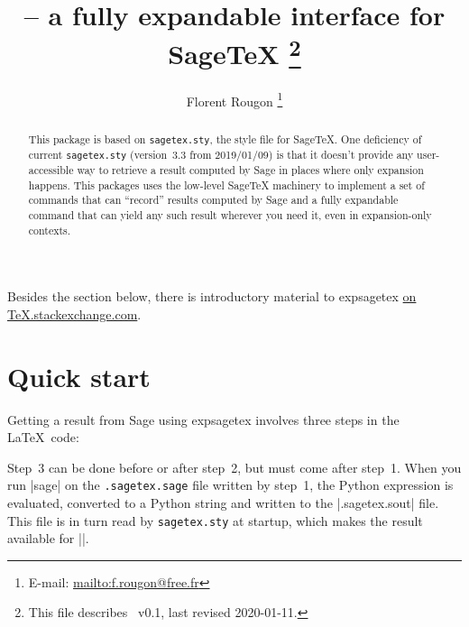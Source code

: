 \documentclass{article}
\title{%
  \pkg{expsagetex} -- a fully expandable interface for SageTeX%
  \thanks{This file describes \pkg{expsagetex}~v0.1, last revised 2020-01-11.}%
}
\author{%
  Florent Rougon%
  \thanks{%
    E-mail: \href{mailto:f.rougon@free.fr}{mailto:f.rougon@free.fr}%
  }%
}
\newcommand*{\pkg}{\textsf}
\begin{document}
\maketitle
\begin{abstract}
  This package is based on \texttt{sagetex.sty}, the style file for SageTeX.
  One deficiency of current \texttt{sagetex.sty} (version~3.3 from 2019/01/09)
  is that it doesn't provide any user-accessible way to retrieve a result
  computed by Sage in places where only expansion happens. This packages uses
  the low-level SageTeX machinery to implement a set of commands that can
  \enquote{record} results computed by Sage and a fully expandable command
  that can yield any such result wherever you need it, even in expansion-only
  contexts.
\end{abstract}

\MakeShortVerb{\|}

\tableofcontents
\clearpage

Besides the  section below, there is introductory
material to \pkg{expsagetex}
\href{https://tex.stackexchange.com/questions/521319/sagetex-1000sep-for-sage-calculated-number-siunitx/521389#521389}{on
  TeX.stackexchange.com}.

\section{Quick start}
\label{sec:quick-start}

Getting a result from Sage using \pkg{expsagetex} involves three steps in the
\LaTeX\ code:

Step~3 can be done before or after step~2, but must come after step~1. When
you run |sage| on the \texttt{.sagetex.sage} file written by step~1, the
Python expression is evaluated, converted to a Python string and written to
the |.sagetex.sout| file. This file is in turn read by \texttt{sagetex.sty} at
startup, which makes the result available for |\estGet|.
\end{document}
